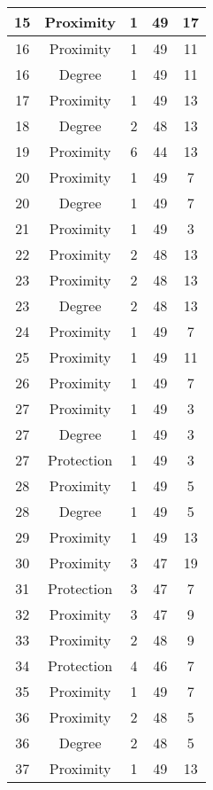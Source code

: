 \documentclass[results.tex]{subfiles}
\begin{document}
\begin{center}
\begin{tabular}{| c || c | c | c | c |}
    \hline
    15 & Proximity & 1 & 49 & 17 \\ 
    \hline
    16 & Proximity & 1 & 49 & 11 \\ 
    \hline
    16 & Degree & 1 & 49 & 11 \\ 
    \hline
    17 & Proximity & 1 & 49 & 13 \\ 
    \hline
    18 & Degree & 2 & 48 & 13 \\ 
    \hline
    19 & Proximity & 6 & 44 & 13 \\ 
    \hline
    20 & Proximity & 1 & 49 & 7 \\ 
    \hline
    20 & Degree & 1 & 49 & 7 \\ 
    \hline
    21 & Proximity & 1 & 49 & 3 \\ 
    \hline
    22 & Proximity & 2 & 48 & 13 \\ 
    \hline
    23 & Proximity & 2 & 48 & 13 \\ 
    \hline
    23 & Degree & 2 & 48 & 13 \\ 
    \hline
    24 & Proximity & 1 & 49 & 7 \\ 
    \hline
    25 & Proximity & 1 & 49 & 11 \\ 
    \hline
    26 & Proximity & 1 & 49 & 7 \\ 
    \hline
    27 & Proximity & 1 & 49 & 3 \\ 
    \hline
    27 & Degree & 1 & 49 & 3 \\ 
    \hline
    27 & Protection & 1 & 49 & 3 \\ 
    \hline
    28 & Proximity & 1 & 49 & 5 \\ 
    \hline
    28 & Degree & 1 & 49 & 5 \\ 
    \hline
    29 & Proximity & 1 & 49 & 13 \\ 
    \hline
    30 & Proximity & 3 & 47 & 19 \\ 
    \hline
    31 & Protection & 3 & 47 & 7 \\ 
    \hline
    32 & Proximity & 3 & 47 & 9 \\ 
    \hline
    33 & Proximity & 2 & 48 & 9 \\ 
    \hline
    34 & Protection & 4 & 46 & 7 \\ 
    \hline
    35 & Proximity & 1 & 49 & 7 \\ 
    \hline
    36 & Proximity & 2 & 48 & 5 \\ 
    \hline
    36 & Degree & 2 & 48 & 5 \\ 
    \hline
    37 & Proximity & 1 & 49 & 13 \\ 

\end{tabular}
\end{center}
\end{document}
